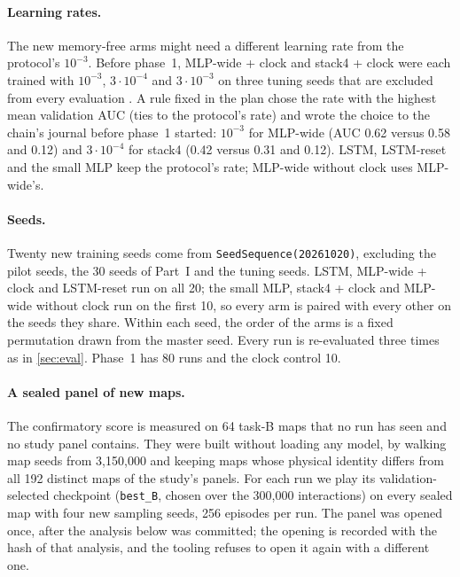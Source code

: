 \paragraph{Learning rates.}
The new memory-free arms might need a different learning rate from the protocol's $10^{-3}$.
Before phase~1, MLP-wide + clock and stack4 + clock were each trained with $10^{-3}$,
$3\cdot10^{-4}$ and $3\cdot10^{-3}$ on three tuning seeds that are excluded from every
evaluation \citep{eimer2023hyperparameters}. A rule fixed in the plan chose the rate with the
highest mean validation AUC (ties to the protocol's rate) and wrote the choice to the chain's
journal before phase~1 started: $10^{-3}$ for MLP-wide (AUC 0.62 versus 0.58 and 0.12) and
$3\cdot10^{-4}$ for stack4 (0.42 versus 0.31 and 0.12). LSTM, LSTM-reset and the small MLP keep the
protocol's rate; MLP-wide without clock uses MLP-wide's.

\paragraph{Seeds.}
Twenty new training seeds come from \texttt{SeedSequence(20261020)}, excluding the pilot seeds,
the 30 seeds of Part~I and the tuning seeds. LSTM, MLP-wide + clock and LSTM-reset run on all 20;
the small MLP, stack4 + clock and MLP-wide without clock run on the first 10, so every arm is
paired with every other on the seeds they share. Within each seed, the order of the arms is a
fixed permutation drawn from the master seed. Every run is re-evaluated three times as in
\cref{sec:eval}. Phase~1 has 80 runs and the clock control 10.

\paragraph{A sealed panel of new maps.}
The confirmatory score is measured on 64 task-B maps that no run has seen and no study panel
contains. They were built without loading any model, by walking map seeds from 3,150,000 and
keeping maps whose physical identity differs from all 192 distinct maps of the study's panels.
For each run we play its validation-selected checkpoint (\texttt{best\_B}, chosen over the 300,000
interactions) on every sealed map with four new sampling seeds, 256 episodes per run. The panel
was opened once, after the analysis below was committed; the opening is recorded with the hash
of that analysis, and the tooling refuses to open it again with a different one.

